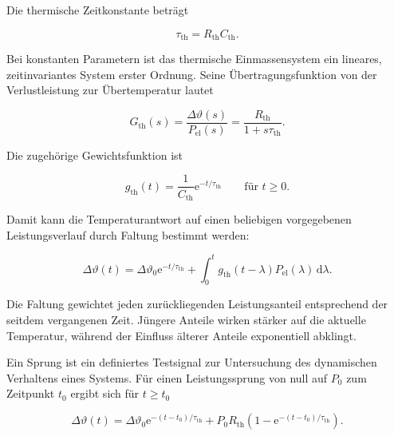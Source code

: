 Die thermische Zeitkonstante beträgt

\begin{equation}
  \tau_{\mathrm{th}}
  =
  R_{\mathrm{th}}C_{\mathrm{th}}.
  \label{eq:thermische_zeitkonstante}
\end{equation}

Bei konstanten Parametern ist das thermische Einmassensystem ein lineares,
zeitinvariantes System erster Ordnung. Seine Übertragungsfunktion von der
Verlustleistung zur Übertemperatur lautet

\begin{equation}
  G_{\mathrm{th}}(s)
  =
  \frac{\Delta\vartheta(s)}{P_{\mathrm{el}}(s)}
  =
  \frac{R_{\mathrm{th}}}
  {1+s\tau_{\mathrm{th}}}.
  \label{eq:uebertragungsfunktion_thermisch}
\end{equation}

Die zugehörige Gewichtsfunktion ist

\begin{equation}
  g_{\mathrm{th}}(t)
  =
  \frac{1}{C_{\mathrm{th}}}
  \mathrm{e}^{-t/\tau_{\mathrm{th}}}
  \qquad \text{für }t\geq0.
  \label{eq:gewichtsfunktion_thermisch}
\end{equation}

Damit kann die Temperaturantwort auf einen beliebigen vorgegebenen
Leistungsverlauf durch Faltung bestimmt werden:

\begin{equation}
  \Delta\vartheta(t)
  =
  \Delta\vartheta_0
  \mathrm{e}^{-t/\tau_{\mathrm{th}}}
  +
  \int_0^t
  g_{\mathrm{th}}(t-\lambda)
  P_{\mathrm{el}}(\lambda)
  \,\mathrm{d}\lambda.
  \label{eq:faltung_thermisches_system}
\end{equation}

Die Faltung gewichtet jeden zurückliegenden Leistungsanteil entsprechend der
seitdem vergangenen Zeit. Jüngere Anteile wirken stärker auf die aktuelle
Temperatur, während der Einfluss älterer Anteile exponentiell abklingt.

Ein Sprung ist ein definiertes Testsignal zur Untersuchung des dynamischen
Verhaltens eines Systems. Für einen Leistungssprung von null auf \(P_0\) zum
Zeitpunkt \(t_0\) ergibt sich für \(t\geq t_0\)

\begin{equation}
  \Delta\vartheta(t)
  =
  \Delta\vartheta_0
  \mathrm{e}^{-(t-t_0)/\tau_{\mathrm{th}}}
  +
  P_0R_{\mathrm{th}}
  \left(
    1-
    \mathrm{e}^{-(t-t_0)/\tau_{\mathrm{th}}}
  \right).
  \label{eq:pt1_sprungantwort_thermisch}
\end{equation}

